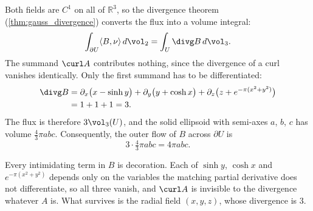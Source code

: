 \begin{exercisesolution}
\label{sol:examHS24_KP1_part2_flux}
Both fields are $C^1$ on all of $\mathbb{R}^3$, so the divergence theorem
(\cref{thm:gauss_divergence}) converts the flux into a volume integral:
\[\int_{\partial U} \langle B, \nu\rangle \, d\vol_2 = \int_U \divg B \, d\vol_3 .\]
The summand $\curl A$ contributes nothing, since the divergence of a curl vanishes identically.
Only the first summand has to be differentiated:
\begin{align*}
  \divg B &= \partial_x\big(x - \sinh y\big) + \partial_y\big(y + \cosh x\big)
             + \partial_z\big(z + e^{-\pi(x^2+y^2)}\big) \\
          &= 1 + 1 + 1 = 3 .
\end{align*}
The flux is therefore $3\vol_3(U)$, and the solid ellipsoid with semi-axes $a$, $b$, $c$ has volume
$\tfrac43\pi abc$. Consequently, the outer flow of $B$ across $\partial U$ is
\[3 \cdot \tfrac43\pi abc = 4\pi abc .\]
\begin{remark}
Every intimidating term in $B$ is decoration. Each of $\sinh y$, $\cosh x$ and
$e^{-\pi(x^2+y^2)}$ depends only on the variables the matching partial derivative does not
differentiate, so all three vanish, and $\curl A$ is invisible to the divergence whatever $A$ is.
What survives is the radial field $(x,y,z)$, whose divergence is $3$.
\end{remark}
\end{exercisesolution}

